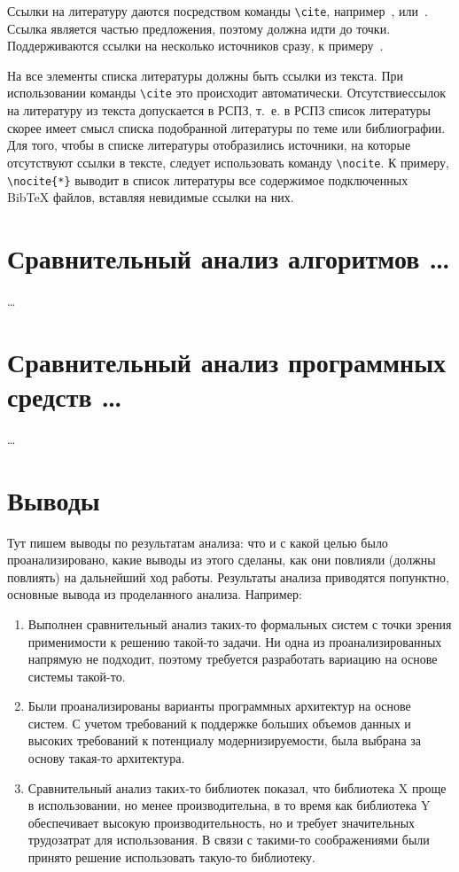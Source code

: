 Ссылки на литературу даются посредством команды \texttt{\textbackslash{}cite},
например~\cite{Lermontov}, или~\cite{Pokrovski}. Ссылка является частью
предложения, поэтому должна идти до точки. Поддерживаются ссылки на несколько
источников сразу, к примеру~\cite{Borozda,Lagkueva,Methodology,Lermontov}.

На все элементы списка литературы должны быть ссылки из текста. При
использовании команды \texttt{\textbackslash{}cite} это происходит
автоматически. Отсутствиессылок на литературу из текста допускается в РСПЗ,
т.~е. в РСПЗ список литературы скорее имеет смысл списка подобранной литературы
по теме или библиографии. Для того, чтобы в списке литературы отобразились
источники, на которые отсутствуют ссылки в тексте, следует использовать команду
\texttt{\textbackslash{}nocite}. К примеру, \texttt{\textbackslash{}nocite\{*\}}
выводит в список литературы все содержимое подключенных BibTeX файлов, вставляя
невидимые ссылки на них.

\section{Сравнительный анализ алгоритмов \dots}

\dots





\section{Сравнительный анализ программных средств \dots}

\dots




\section{Выводы}

Тут пишем выводы по результатам анализа: что и с какой целью было проанализировано, какие выводы из этого сделаны, как они повлияли (должны повлиять) на дальнейший ход работы. Результаты анализа приводятся попунктно, основные вывода из проделанного анализа. Например:

\begin{enumerate}
	\item Выполнен сравнительный анализ таких-то формальных систем с точки зрения применимости к решению такой-то задачи. Ни одна из проанализированных напрямую не подходит, поэтому требуется разработать вариацию на основе системы такой-то.
	\item Были проанализированы варианты программных архитектур на основе систем. С учетом требований к поддержке больших объемов данных и высоких требований к потенциалу модернизируемости, была выбрана за основу такая-то архитектура.
	\item Сравнительный анализ таких-то библиотек показал, что библиотека X проще в использовании, но менее производительна, в то время как библиотека Y обеспечивает высокую производительность, но и требует значительных трудозатрат для использования. В связи с такими-то соображениями были принято решение использовать такую-то библиотеку.
\end{enumerate}



